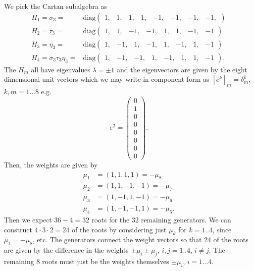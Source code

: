 \documentclass[main.tex]{subfiles}
\begin{document}
We pick the Cartan subalgebra as
\begin{align}\label{eq:19ACartan}
H_1=\sigma_3=&\text{diag}\begin{pmatrix}1,&1,&1,&1,&-1,&-1,&-1,&-1,\end{pmatrix}\\
H_2=\tau_3=&\text{diag}\begin{pmatrix}1,&1,&-1,&-1,&1,&1,&-1,&-1\end{pmatrix}\\
H_3=\eta_3=&\text{diag}\begin{pmatrix}1,&-1,&1,&-1,&1,&-1,&1,&-1\end{pmatrix}\\
H_4=\sigma_3\tau_3\eta_3=&\text{diag}\begin{pmatrix}1,&-1,&-1,&1,&-1,&1,&1,&-1\end{pmatrix}.
\end{align}
The $H_m$ all have eigenvalues $\lambda=\pm1$ and the eigenvectors are given by the eight dimensional unit vectors which we may write in component form as $[e^k]_m=\delta^k_m$, $k,m=1...8$ e.g.
\begin{equation}
e^2=\begin{pmatrix}0\\1\\0\\0\\0\\0\\0\\0\end{pmatrix}.
\end{equation}
Then, the weights are given by
\begin{align}
\mu_1&=(1,1,1,1)=-\mu_8\\
\mu_2&=(1,1,-1,-1)=-\mu_7\\
\mu_3&=(1,-1,1,-1)=-\mu_6\\
\mu_4&=(1,-1,-1,1)=-\mu_5.
\end{align}
Then we expect $36-4=32$ roots for the $32$ remaining generators. We can construct $4\cdot3\cdot2=24$ of the roots by considering just $\mu_k$ for $k=1..4$, since $\mu_1=-\mu_8$, etc. The generators connect the weight vectors so that 24 of the roots are given by the difference in the weights $\pm\mu_i\pm\mu_j$, $i,j=1..4$, $i\neq j$. The remaining $8$ roots must just be the weights themselves $\pm\mu_i$, $i=1...4$.
\end{document}
